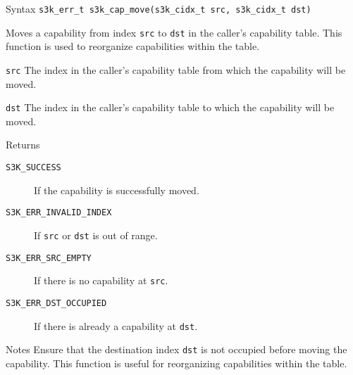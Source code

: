 \documentclass[a4paper,11pt]{article}
\newenvironment{syscalldoc}[1]{
  \begin{tcolorbox}[breakable,title=\subsection{\texttt{#1()}}]
  \begin{description}[leftmargin=!,style=nextline,noitemsep]
}{
  \end{description}
  \end{tcolorbox}
}
\begin{document}
\begin{syscalldoc}{s3k\_cap\_move}
  \item[Syntax] \lstinline{s3k_err_t s3k_cap_move(s3k_cidx_t src, s3k_cidx_t dst)}

  \item[Description] Moves a capability from index \verb|src| to \verb|dst| in the caller's capability table. This function is used to reorganize capabilities within the table.

  \item[Parameters]
    \begin{description}
      \item[]
      \item[\texttt{src}] The index in the caller's capability table from which the capability will be moved.
      \item[\texttt{dst}] The index in the caller's capability table to which the capability will be moved.
    \end{description}

  \item[Returns]
    \begin{description}
      \item[]
      \item[\texttt{S3K\_SUCCESS}] If the capability is successfully moved.
      \item[\texttt{S3K\_ERR\_INVALID\_INDEX}] If \verb|src| or \verb|dst| is out of range.
      \item[\texttt{S3K\_ERR\_SRC\_EMPTY}] If there is no capability at \verb|src|.
      \item[\texttt{S3K\_ERR\_DST\_OCCUPIED}] If there is already a capability at \verb|dst|.
    \end{description}

  \item[Notes] Ensure that the destination index \verb|dst| is not occupied before moving the capability. This function is useful for reorganizing capabilities within the table.
\end{syscalldoc}
\end{document}
